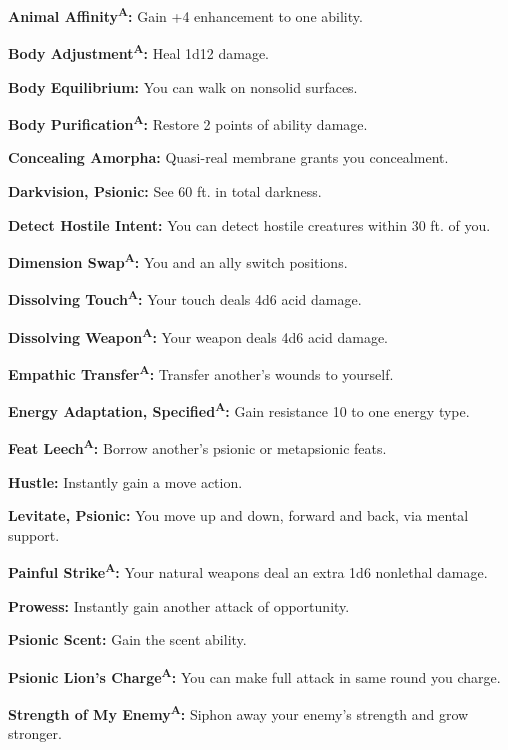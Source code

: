 \documentclass{article}
\begin{document}
\textbf{Animal Affinity}\textsuperscript{\textbf{A}}\textbf{: }Gain +4 enhancement 
to one ability.

\textbf{Body Adjustment}\textsuperscript{\textbf{A}}\textbf{: }Heal 1d12 damage.

\textbf{Body Equilibrium: }You can walk on nonsolid surfaces.

\textbf{Body Purification}\textsuperscript{\textbf{A}}\textbf{: }Restore 2 points 
of ability damage.

\textbf{Concealing Amorpha: }Quasi-real membrane grants you concealment.

\textbf{Darkvision, Psionic: }See 60 ft. in total darkness.

\textbf{Detect Hostile Intent: }You can detect hostile creatures within 30 ft. 
of you.

\textbf{Dimension Swap}\textsuperscript{\textbf{A}}\textbf{: }You and an ally switch 
positions.

\textbf{Dissolving Touch}\textsuperscript{\textbf{A}}\textbf{: }Your touch deals 
4d6 acid damage.

\textbf{Dissolving Weapon}\textsuperscript{\textbf{A}}\textbf{: }Your weapon deals 
4d6 acid damage.

\textbf{Empathic Transfer}\textsuperscript{\textbf{A}}\textbf{: }Transfer another's 
wounds to yourself.

\textbf{Energy Adaptation, Specified}\textsuperscript{\textbf{A}}\textbf{: }Gain 
resistance 10 to one energy type.

\textbf{Feat Leech}\textsuperscript{\textbf{A}}\textbf{: }Borrow another's psionic 
or metapsionic feats.

\textbf{Hustle: }Instantly gain a move action.

\textbf{Levitate, Psionic: }You move up and down, forward and back, via mental 
support.

\textbf{Painful Strike}\textsuperscript{\textbf{A}}\textbf{: }Your natural weapons 
deal an extra 1d6 nonlethal damage.

\textbf{Prowess: }Instantly gain another attack of opportunity.

\textbf{Psionic Scent: }Gain the scent ability.

\textbf{Psionic Lion's Charge}\textsuperscript{\textbf{A}}\textbf{: }You can make 
full attack in same round you charge.

\textbf{Strength of My Enemy}\textsuperscript{\textbf{A}}\textbf{: }Siphon away 
your enemy's strength and grow stronger.
\end{document}
